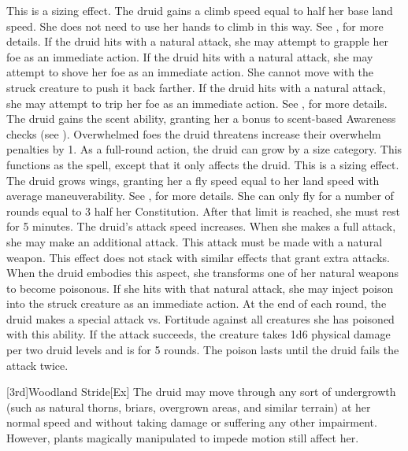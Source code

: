 This is a sizing effect.
The druid gains a climb speed equal to half her base land speed.
She does not need to use her hands to climb in this way.
See , for more details.
If the druid hits with a natural attack, she may attempt to grapple her foe as an immediate action.
If the druid hits with a natural attack, she may attempt to shove her foe as an immediate action.
She cannot move with the struck creature to push it back farther.
If the druid hits with a natural attack, she may attempt to trip her foe as an immediate action.
See , for more details.
The druid gains the scent ability, granting her a  bonus to scent-based Awareness checks (see ).
Overwhelmed foes the druid threatens increase their overwhelm penalties by 1.
As a full-round action, the druid can grow by a size category.
This functions as the  spell, except that it only affects the druid.
This is a sizing effect.
The druid grows wings, granting her a fly speed equal to her land speed with average maneuverability.
See , for more details.
She can only fly for a number of rounds equal to 3 \add half her Constitution.
After that limit is reached, she must rest for 5 minutes.
The druid's attack speed increases.
When she makes a full attack, she may make an additional attack.
This attack must be made with a natural weapon.
This effect does not stack with similar effects that grant extra attacks.
When the druid embodies this aspect, she transforms one of her natural weapons to become poisonous.
If she hits with that natural attack, she may inject poison into the struck creature as an immediate action.
At the end of each round, the druid makes a special attack vs. Fortitude against all creatures she has poisoned with this ability.
If the attack succeeds, the creature takes 1d6 physical damage per two druid levels and is \sickened for 5 rounds.
The poison lasts until the druid fails the attack twice.

[3rd]{Woodland Stride}[Ex]
The druid may move through any sort of undergrowth (such as natural thorns, briars, overgrown areas, and similar terrain) at her normal speed and without taking damage or suffering any other impairment.
However, plants magically manipulated to impede motion still affect her.

